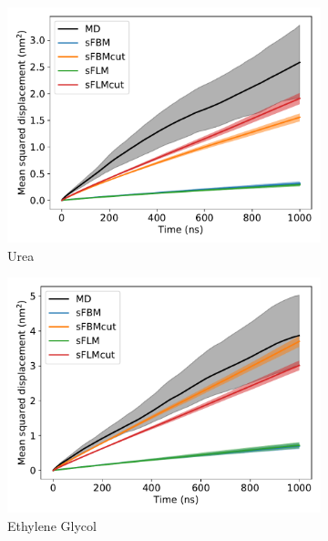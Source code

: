 \documentclass{article}
\begin{document}
  \begin{figure}
  \centering
  \begin{subfigure}{0.45\textwidth}
  \includegraphics[width=\textwidth]{2mode_msd_comparison_URE.pdf}
  \caption{Urea}\label{fig:2mode_msd_comparison_URE}
  \end{subfigure}
  \begin{subfigure}{0.45\textwidth}
  \includegraphics[width=\textwidth]{2mode_msd_comparison_GCL.pdf}
  \caption{Ethylene Glycol}\label{fig:2mode_msd_comparison_GCL}
  \end{subfigure}
  \begin{subfigure}{0.45\textwidth}

\end{subfigure}
\end{figure}
\end{document}
